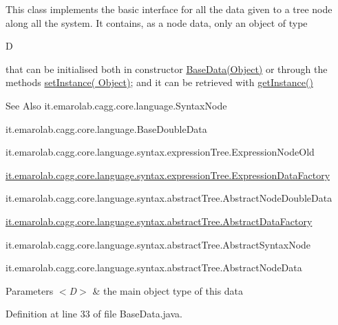This class implements the basic interface for all the data given to a tree node along all the system. It contains, as a node data, only an object of type
\begin{DoxyCode}
D 
\end{DoxyCode}
 that can be initialised both in constructor \hyperlink{}{Base\-Data(\-Object)} or through the methods \hyperlink{}{set\-Instance( Object)}; and it can be retrieved with \hyperlink{classit_1_1emarolab_1_1cagg_1_1core_1_1language_1_1BaseData_3_01D_01_4_abb19a8b413efee9dacbcde1779aae981}{get\-Instance()} 

\begin{DoxySeeAlso}{See Also}
it.\-emarolab.\-cagg.\-core.\-language.\-Syntax\-Node 

it.\-emarolab.\-cagg.\-core.\-language.\-Base\-Double\-Data 

it.\-emarolab.\-cagg.\-core.\-language.\-syntax.\-expression\-Tree.\-Expression\-Node\-Old 

\hyperlink{classit_1_1emarolab_1_1cagg_1_1core_1_1language_1_1syntax_1_1expressionTree_1_1ExpressionDataFactory}{it.\-emarolab.\-cagg.\-core.\-language.\-syntax.\-expression\-Tree.\-Expression\-Data\-Factory} 

it.\-emarolab.\-cagg.\-core.\-language.\-syntax.\-abstract\-Tree.\-Abstract\-Node\-Double\-Data 

\hyperlink{classit_1_1emarolab_1_1cagg_1_1core_1_1language_1_1syntax_1_1abstractTree_1_1AbstractDataFactory}{it.\-emarolab.\-cagg.\-core.\-language.\-syntax.\-abstract\-Tree.\-Abstract\-Data\-Factory} 

it.\-emarolab.\-cagg.\-core.\-language.\-syntax.\-abstract\-Tree.\-Abstract\-Syntax\-Node 

it.\-emarolab.\-cagg.\-core.\-language.\-syntax.\-abstract\-Tree.\-Abstract\-Node\-Data
\end{DoxySeeAlso}

\begin{DoxyParams}{Parameters}
{\em $<$\-D$>$} & the main object type of this data \\
\hline
\end{DoxyParams}


Definition at line 33 of file Base\-Data.\-java.



